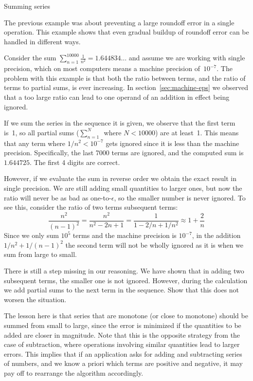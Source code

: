  {Summing series}
\label{sec:fp-summing}

The previous example was about preventing a large roundoff error in a
single operation. This example shows that even gradual buildup of
roundoff error can be handled in different ways.

Consider the sum $\sum_{n=1}^{10000}\frac{1}{n^2}=1.644834\ldots$
and assume we are working with single precision, which on most computers
means a machine precision of~$10^{-7}$. The problem with this example
is that both the ratio between terms, and the ratio of terms to
partial sums, is ever increasing. In section~\ref{sec:machine-eps} we
observed that a too large ratio can lead to one operand of an addition in
effect being ignored.

If we sum the series in the sequence it is given, we observe that
the first term is~1, so all partial sums ($\sum_{n=1}^N$~where $N<10000$)
are at least~1. This means that any term where $1/n^2<10^{-7}$ gets
ignored since it is less than the machine precision.
Specifically, the last 7000 terms are ignored, and
the computed sum is~$1.644725$. The first 4 digits are correct.

However, if we evaluate the sum in reverse order
we obtain the exact result in single precision. We are still adding
small quantities to larger ones, but now the ratio will never be as
bad as one-to-$\epsilon$, so the smaller number is never ignored.
To see this,
consider the ratio of two terms subsequent terms:
\begin{equation}
  \frac{n^2}{(n-1)^2}=\frac{n^2}{n^2-2n+1}=\frac1{1-2/n+1/n^2}
    \approx 1+\frac2n
\end{equation}
Since we only sum $10^5$ terms and the machine precision is $10^{-7}$, 
in the addition $1/n^2+1/(n-1)^2$ the second term will not be wholly
ignored as it is when we sum from large to small.
\begin{exercise}
  There is still a step missing in our reasoning. We have shown that
  in adding two subsequent terms, the smaller one is not
  ignored. However, during the calculation we add partial sums to the
  next term in the sequence. Show that this does not worsen the situation.
\end{exercise}

The lesson here is that series that are monotone (or close to
monotone) should be summed from small to large, since the error is
minimized if the quantities to be added are closer in magnitude. Note
that this is the opposite strategy from the case of subtraction, where
operations involving similar quantities lead to larger errors. This
implies that if an application asks for adding and subtracting series
of numbers, and we know a priori which terms are positive and
negative, it may pay off to rearrange the algorithm accordingly.


